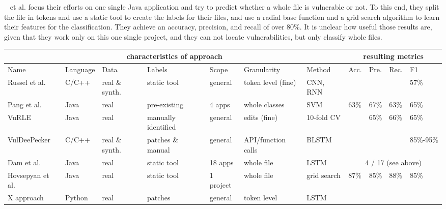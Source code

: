 \documentclass[
	a4paper,
	pagesize,
	pdftex,
	12pt,
	twoside, %
	BCOR=5mm, %
	ngerman,
	fleqn,
	final,
	]{scrartcl}
\begin{document}
~\cite{Hovsepyan.2012} et al. focus their efforts on one single Java application and try to predict whether a whole file is vulnerable or not. To this end, they split the file in tokens and use a static tool to create the labels for their files, and use a radial base function and a grid search algorithm to learn their features for the classification. They achieve an accuracy, precision, and recall of over 80\%. It is unclear how useful those results are, given that they work only on this one single project, and they can not locate vulnerabilities, but only classify whole files. 

\scriptsize
\begin{tabular}{ | p{1.4cm} | p{1cm}|  p{0.8cm}| p{1.5cm} |  p{1.2cm} | p{1.5cm} | p{1.2cm} || p{0.4cm}|p{0.4cm}|p{0.4cm}|p{0.4cm}|  }
	\hline
	\multicolumn{7}{|c||}{characteristics of approach} & \multicolumn{4}{c|}{resulting metrics} \\
	\hline
	Name &  Language & Data & Labels & Scope &Granularity & Method & Acc. & Pre. & Rec. & F1  \\
	\hline
	Russel et al. & C/C++ & real \& synth. & static tool & general & token level (fine) & CNN, RNN &  &   &   &  57\%  \\
	\hline
	Pang et al. & Java & real  & pre-existing  & 4 apps & whole classes & SVM & 63\% & 67\%  & 63\%  & 65\%    \\
	\hline
	VuRLE & Java & real  & manually identified  & general & edits (fine) & 10-fold CV &  & 65\%  & 66\%  & 65\%    \\
	\hline
	VulDeePecker & C/C++ & real \& synth.  & patches \& manual & general & API/function calls & BLSTM &  &   &  & 85\%-95\%    \\
	\hline
	Dam et al. & Java & real &static tool & 18 apps & whole file & LSTM & \multicolumn{4}{c|}{ 4 / 17 (see above)}   \\
	\hline
	Hovsepyan et al. & Java & real  &static tool  & 1 project & whole file & grid search & 87\% & 	85\%  & 88\%  & 85\%   \\
	\hline
	X approach & Python & real  &patches& general  & token level & LSTM &  & &  &    \\
	\hline
	\hline 
\end{tabular}\\
\normalsize
\end{document}
